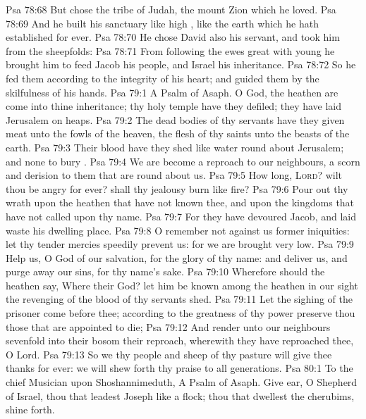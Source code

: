 \vs Psa 78:68 But chose the tribe of Judah, the mount Zion which he loved.
\vs Psa 78:69 And he built his sanctuary like high , like the earth which he hath established for ever.
\vs Psa 78:70 He chose David also his servant, and took him from the sheepfolds:
\vs Psa 78:71 From following the ewes great with young he brought him to feed Jacob his people, and Israel his inheritance.
\vs Psa 78:72 So he fed them according to the integrity of his heart; and guided them by the skilfulness of his hands.
\vs Psa 79:1 A Psalm of Asaph. O God, the heathen are come into thine inheritance; thy holy temple have they defiled; they have laid Jerusalem on heaps.
\vs Psa 79:2 The dead bodies of thy servants have they given  meat unto the fowls of the heaven, the flesh of thy saints unto the beasts of the earth.
\vs Psa 79:3 Their blood have they shed like water round about Jerusalem; and  none to bury .
\vs Psa 79:4 We are become a reproach to our neighbours, a scorn and derision to them that are round about us.
\vs Psa 79:5 How long, \textsc{Lord}? wilt thou be angry for ever? shall thy jealousy burn like fire?
\vs Psa 79:6 Pour out thy wrath upon the heathen that have not known thee, and upon the kingdoms that have not called upon thy name.
\vs Psa 79:7 For they have devoured Jacob, and laid waste his dwelling place.
\vs Psa 79:8 O remember not against us former iniquities: let thy tender mercies speedily prevent us: for we are brought very low.
\vs Psa 79:9 Help us, O God of our salvation, for the glory of thy name: and deliver us, and purge away our sins, for thy name's sake.
\vs Psa 79:10 Wherefore should the heathen say, Where  their God? let him be known among the heathen in our sight  the revenging of the blood of thy servants  shed.
\vs Psa 79:11 Let the sighing of the prisoner come before thee; according to the greatness of thy power preserve thou those that are appointed to die;
\vs Psa 79:12 And render unto our neighbours sevenfold into their bosom their reproach, wherewith they have reproached thee, O Lord.
\vs Psa 79:13 So we thy people and sheep of thy pasture will give thee thanks for ever: we will shew forth thy praise to all generations.
\vs Psa 80:1 To the chief Musician upon Shoshannimeduth, A Psalm of Asaph. Give ear, O Shepherd of Israel, thou that leadest Joseph like a flock; thou that dwellest  the cherubims, shine forth.
